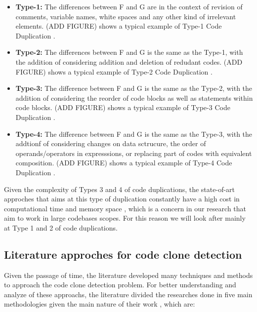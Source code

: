 \begin{itemize}
	\item \textbf{Type-1:} The differences between F and G are in the context of revision of comments, variable names, white spaces and any other kind of irrelevant elements. (ADD FIGURE) shows a typical example of Type-1 Code Duplication \citep{litreview}. 

	\item \textbf{Type-2:} The differences between F and G is the same as the Type-1, with the addition of considering addition and deletion of redudant codes. (ADD FIGURE) shows a typical example of Type-2 Code Duplication \citep{litreview}. 

	\item \textbf{Type-3:} The difference between F and G is the same as the Type-2, with the addition of considering the reorder of code blocks as well as statements within code blocks. (ADD FIGURE) shows a typical example of Type-3 Code Duplication \citep{litreview}. 

	\item \textbf{Type-4:} The difference between F and G is the same as the Type-3, with the addtionf of considering changes on data sctrucure, the order of operands/operators in expresssions, or replacing part of codes with equivalent composition. (ADD FIGURE) shows a typical example of Type-4 Code Duplication \citep{litreview}. 
\end{itemize}

Given the complexity of Types 3 and 4 of code duplications, the state-of-art approches that aims at this type of
duplication constantly have a high cost in computational time and memory space \citep{letreview}, which is a concern in our research 
that aim to work in large codebases scopes. For this reason we will look after mainly at Type 1 and 2 of code duplications.

\subsection{Literature approches for code clone detection}

Given the passage of time, the literature developed many techniques and methods to approach the code clone detection problem. 
For better understanding and analyze of these approachs, the literature divided the researches done in
five main methodologies given the main nature of their work \citep{litreview} , which are:

